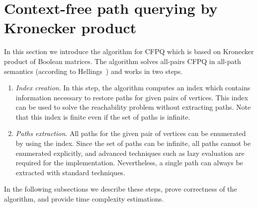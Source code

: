 \section{Context-free path querying by Kronecker product}


In this section we introduce the algorithm for CFPQ which is based on Kronecker product of Boolean matrices.
The algorithm solves all-pairs CFPQ in all-path semantics (according to Hellings~\cite{hellingsPathQuerying}) and works in two steps.
\begin{enumerate}
\item \emph{Index creation}.
 In this step, the algorithm computes an index which contains information necessary to restore paths for given pairs of vertices.
 This index can be used to solve the reachability problem without extracting paths.
 Note that this index is finite even if the set of paths is infinite.
\item \emph{Paths extraction}.
All paths for the given pair of vertices can be enumerated by using the index.
Since the set of paths can be infinite, all paths cannot be enumerated explicitly, and advanced techniques such as lazy evaluation are required for the implementation.
Nevertheless, a single path can always be extracted with standard techniques.
\end{enumerate}

In the following subsections we describe these steps, prove correctness of the algorithm, and provide time complexity estimations.

